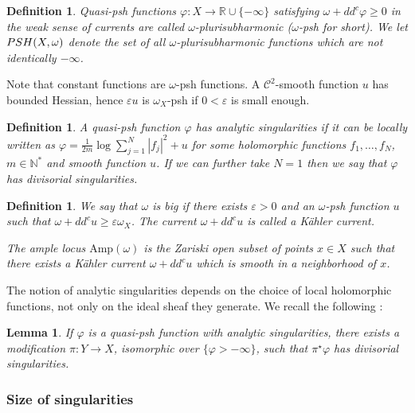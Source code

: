 \documentclass[10pt,a4paper]{amsart}
\numberwithin{equation}{section}
\newtheorem{lem}[theorem]{Lemma}
\newtheorem{defi}[theorem]{Definition}
\newcommand{\PSH}{\textup{PSH}}
\newcommand{\R}{\mathbb R}
\newcommand{\N}{\mathbb N}
\newcommand{\f}{\varphi}
\newcommand \e {\varepsilon}
\begin{document}
\begin{defi}
Quasi-psh functions
$\f:X \rightarrow \R \cup \{-\infty\}$ satisfying
$\omega+dd^c \f \geq 0$
in the weak sense of currents are called $\omega$-plurisubharmonic ($\omega$-psh for short).
We let $\PSH(X,\omega)$ denote the set of all $\omega$-plurisubharmonic functions which are not identically $-\infty$.  
\end{defi}

Note that constant functions are $\omega$-psh functions.
A ${\mathcal C}^2$-smooth function $u$ has bounded Hessian, hence $\e u$ is
$\omega_X$-psh if $0<\e$ is small enough.
 
 
\begin{defi}\label{defi:analsing} 
A quasi-psh function $\f$ has \emph{analytic singularities}
 if it can be locally written as 
$
\f=\frac{1}{2m}\log\sum_{j=1}^N|f_j|^2+u
$
for some holomorphic functions $f_1,\dots,f_N$, $m\in\N^*$ and smooth function $u$. 
If we can further take $N=1$ then we say that $\f$ has \emph{divisorial singularities}.
\end{defi}


\begin{defi}\label{defi:big-ample locus} 
We say that $\omega$ is \emph{big} if there exists $\varepsilon>0$ and
an $\omega$-psh function $u$ such that $\omega+dd^c u \geq \varepsilon \omega_X$.
The current $\omega+dd^c u$ is called a \emph{K\"ahler current}.

The \emph{ample locus} $\mathrm{Amp}(\omega)$  is the Zariski open subset 
of points $x\in X$ such that there exists a K\"ahler current 
$\omega+dd^c u$
which is smooth in a neighborhood of $x$. 
\end{defi}

The notion of analytic singularities  depends on the choice of local holomorphic functions, 
not only on the ideal sheaf they generate.
We recall the following \cite[Lemma 1.7]{BGL25}:

\begin{lem}\label{lem:analres} 
If $\f$ is a quasi-psh function with analytic singularities, there exists a modification $\pi\colon Y\to X$, isomorphic over 
 $\{\f>-\infty\}$, such that $\pi^\star\f$ has divisorial singularities. 
\end{lem}











\subsubsection*{Size of singularities}
\end{document}
